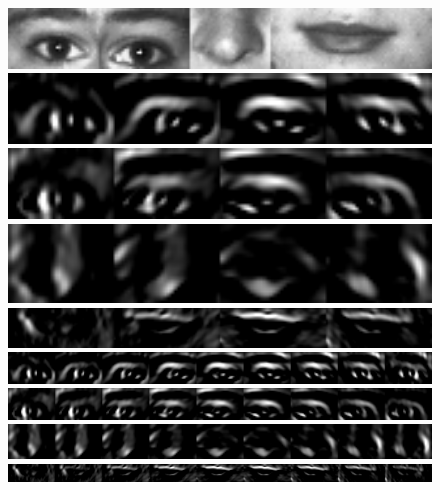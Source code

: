 \begin{figure}[h!]
	\centering
	\includegraphics[width=15cm]{imagenes/M2_concat.jpg}\\

	\includegraphics[width=15cm]{imagenes/M2_concat_od_45deg.png}
	\includegraphics[width=15cm]{imagenes/M2_concat_oi_45deg.png}
	\includegraphics[width=15cm]{imagenes/M2_concat_nariz_45deg.png}
	\includegraphics[width=15cm]{imagenes/M2_concat_boca_45deg.png}\\

	\includegraphics[width=15cm]{imagenes/M2_concat_od_20deg.png}
	\includegraphics[width=15cm]{imagenes/M2_concat_oi_20deg.png}
	\includegraphics[width=15cm]{imagenes/M2_concat_nariz_20deg.png}
	\includegraphics[width=15cm]{imagenes/M2_concat_boca_20deg.png}\\


\end{figure}
